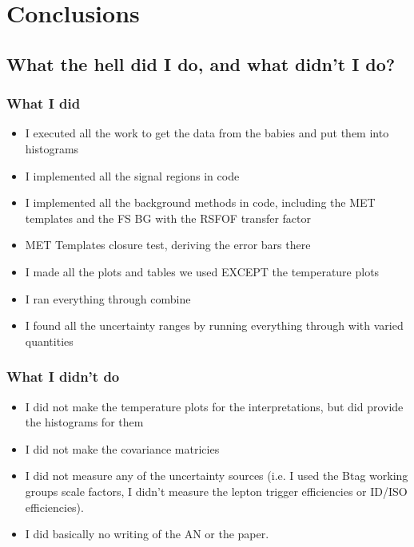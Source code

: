 \chapter{Conclusions}

\section{What the hell did I do, and what didn't I do?}

\subsection{What I did}
\begin{itemize}
  \item I executed all the work to get the data from the babies and put them into histograms
  \item I implemented all the signal regions in code
  \item I implemented all the background methods in code, including the MET templates and the FS BG with the RSFOF transfer factor
  \item MET Templates closure test, deriving the error bars there 
  \item I made all the plots and tables we used EXCEPT the temperature plots
  \item I ran everything through combine
  \item I found all the uncertainty ranges by running everything through with varied quantities
\end{itemize}

\subsection{What I didn't do}
\begin{itemize}
  \item I did not make the temperature plots for the interpretations, but did provide the histograms for them
  \item I did not make the covariance matricies
  \item I did not measure any of the uncertainty sources (i.e. I used the Btag working groups scale factors, I didn't measure the lepton trigger efficiencies or ID/ISO efficiencies).
  \item I did basically no writing of the AN or the paper.
\end{itemize}
